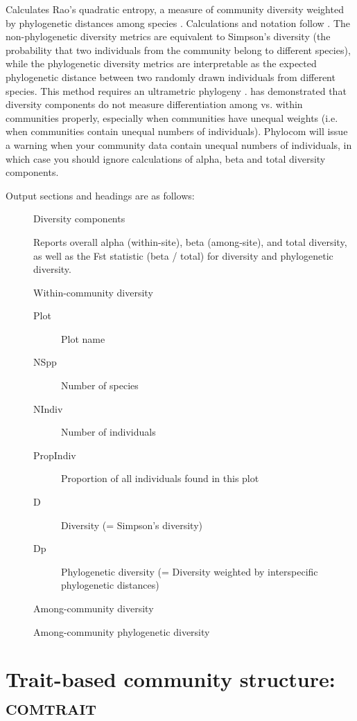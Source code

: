 \documentclass[12pt,letterpaper]{article}
\begin{document}
Calculates Rao's quadratic entropy, a measure of community diversity
weighted by phylogenetic distances among species
\citep{rao1982dad}. Calculations and notation follow
\citet{champely2002mbd}. The non-phylogenetic diversity metrics are
equivalent to Simpson's diversity (the probability that two
individuals from the community belong to different species), while the
phylogenetic diversity metrics are interpretable as the expected
phylogenetic distance between two randomly drawn individuals from different species.
This method requires an ultrametric phylogeny \citep{pavoine2005mdd}. 
\citet{jost2007pdi} has demonstrated that diversity components do not measure differentiation among vs.
within communities properly, especially when
communities have unequal weights (i.e. when communities contain unequal numbers
of individuals). Phylocom will
issue a warning when your community data contain unequal numbers of
individuals, in which case you should ignore calculations of alpha, beta
and total diversity components.

Output sections and headings are as follows:

\begin{description}
  \item[] Diversity components

    Reports overall alpha (within-site), beta (among-site), and total
    diversity, as well as the Fst statistic (beta / total) for
    diversity and phylogenetic diversity.

  \item[] Within-community diversity
    \begin{description}
      \item[Plot] Plot name
      \item[NSpp] Number of species
      \item[NIndiv] Number of individuals
      \item[PropIndiv] Proportion of all individuals found in this plot
      \item[D] Diversity (= Simpson's diversity)
      \item[Dp] Phylogenetic diversity (= Diversity weighted by interspecific phylogenetic distances)
    \end{description}
  \item[] Among-community diversity
  \item[] Among-community phylogenetic diversity
\end{description}

\section{Trait-based community structure: {\scshape comtrait}}
\end{document}
